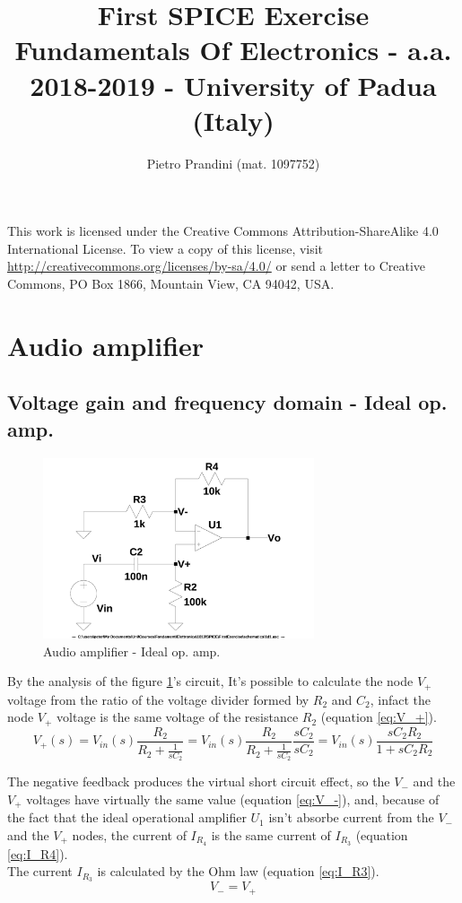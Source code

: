 \documentclass[10pt,a4paper]{article}
\title{First SPICE Exercise\\{\small{Fundamentals Of Electronics - a.a. 2018-2019 -
University of Padua (Italy)}}}
\author{Pietro Prandini (mat. 1097752)}
\begin{document}
\maketitle

\begin{center}
\tiny{This work is licensed under the Creative Commons Attribution-ShareAlike
 4.0 International License. To view a copy of this license, visit
 \href{http://creativecommons.org/licenses/by-sa/4.0/}{http://creativecommons.org/licenses/by-sa/4.0/}
or send a letter to Creative Commons, PO Box 1866, Mountain View, CA 94042,
USA.}
\end{center}

\section{Audio amplifier}
\subsection{Voltage gain and frequency domain - Ideal op. amp.}
\begin{figure}[h]
  \centering
  \includegraphics[width=8cm]{schematics/1d1.jpg}
  \caption{Audio amplifier - Ideal op. amp.}
  \label{1d1schematics}
\end{figure}

By the analysis of the figure \ref{1d1schematics}'s circuit, It's possible to
calculate the node $V_+$ voltage from the ratio of the voltage divider formed by
$R_2$ and $C_2$, infact the node $V_+$ voltage is the same voltage of the
resistance $R_2$ (equation \ref{eq:V_+}).\\
\begin{equation} \label{eq:V_+}
V_+(s) = V_{in}(s)\frac{R_2}{R_2+\frac{1}{sC_2}} =
V_{in}(s)\frac{R_2}{R_2+\frac{1}{sC_2}}\frac{sC_2}{sC_2} =
V_{in}(s)\frac{sC_2R_2}{1+sC_2R_2}
\end{equation}

The negative feedback produces the virtual short circuit effect, so the $V_-$
and the $V_+$ voltages have virtually the same value (equation \ref{eq:V_-}),
and, because of the fact that the ideal operational amplifier $U_1$ isn't
absorbe current from the $V_-$ and the $V_+$ nodes, the current of $I_{R_4}$ is
the same current of $I_{R_3}$ (equation \ref{eq:I_R4}).\\
The current $I_{R_3}$ is calculated by the Ohm law (equation \ref{eq:I_R3}).\\
\begin{equation} \label{eq:V_-}
V_- = V_+
\end{equation}
\end{document}

